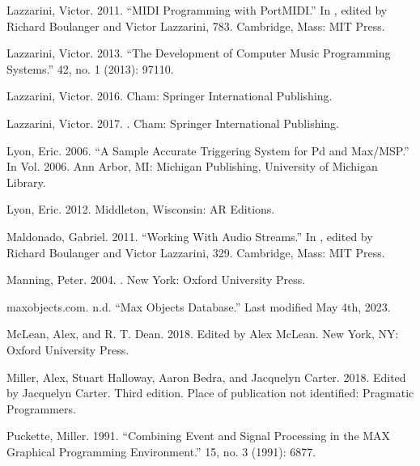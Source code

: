 \documentclass[letterpaper,10pt,english]{sphinxmanual}
\begin{document}
\sphinxAtStartPar
Lazzarini, Victor. 2011. “MIDI Programming with PortMIDI.” In , edited by Richard Boulanger and Victor Lazzarini, 783. Cambridge, Mass: MIT Press.

\sphinxAtStartPar
Lazzarini, Victor. 2013. “The Development of Computer Music Programming Systems.”  42, no. 1 (2013): 97\sphinxhyphen{}110.

\sphinxAtStartPar
Lazzarini, Victor. 2016.  Cham: Springer International Publishing.

\sphinxAtStartPar
Lazzarini, Victor. 2017. . Cham: Springer International Publishing.

\sphinxAtStartPar
Lyon, Eric. 2006. “A Sample Accurate Triggering System for Pd and Max/MSP.” In  Vol. 2006. Ann Arbor, MI: Michigan Publishing, University of Michigan Library.

\sphinxAtStartPar
Lyon, Eric. 2012.  Middleton, Wisconsin: A\sphinxhyphen{}R Editions.

\sphinxAtStartPar
Maldonado, Gabriel. 2011. “Working With Audio Streams.” In , edited by Richard Boulanger and Victor Lazzarini, 329. Cambridge, Mass: MIT Press.

\sphinxAtStartPar
Manning, Peter. 2004. . New York: Oxford University Press.

\sphinxAtStartPar
maxobjects.com. n.d. “Max Objects Database.” Last modified May 4th, 2023. 

\sphinxAtStartPar
McLean, Alex, and R. T. Dean. 2018.  Edited by Alex McLean. New York, NY: Oxford University Press.

\sphinxAtStartPar
Miller, Alex, Stuart Halloway, Aaron Bedra, and Jacquelyn Carter. 2018.  Edited by Jacquelyn Carter. Third edition. Place of publication not identified: Pragmatic Programmers.

\sphinxAtStartPar
Puckette, Miller. 1991. “Combining Event and Signal Processing in the MAX Graphical Programming Environment.”  15, no. 3 (1991): 68\textendash{}77.
\end{document}
